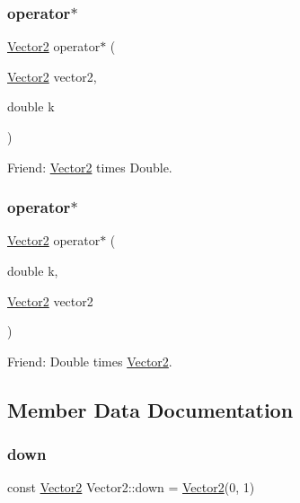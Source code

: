 \subsubsection{\texorpdfstring{operator$\ast$}{operator*}\hspace{0.1cm}{\footnotesize\ttfamily [1/2]}}
{\footnotesize\ttfamily \mbox{\hyperlink{struct_vector2}{Vector2}} operator$\ast$ (\begin{DoxyParamCaption}\item[{\mbox{\hyperlink{struct_vector2}{Vector2}}}]{vector2,  }\item[{double}]{k }\end{DoxyParamCaption})\hspace{0.3cm}{\ttfamily [friend]}}



Friend\+: \mbox{\hyperlink{struct_vector2}{Vector2}} times Double. 

\mbox{\label{struct_vector2_a6ac6360b23e2a1457b794f0aefc18f3a}} 
\subsubsection{\texorpdfstring{operator$\ast$}{operator*}\hspace{0.1cm}{\footnotesize\ttfamily [2/2]}}
{\footnotesize\ttfamily \mbox{\hyperlink{struct_vector2}{Vector2}} operator$\ast$ (\begin{DoxyParamCaption}\item[{double}]{k,  }\item[{\mbox{\hyperlink{struct_vector2}{Vector2}}}]{vector2 }\end{DoxyParamCaption})\hspace{0.3cm}{\ttfamily [friend]}}



Friend\+: Double times \mbox{\hyperlink{struct_vector2}{Vector2}}. 



\subsection{Member Data Documentation}
\mbox{\label{struct_vector2_a64cb9ddeb42abbcfa527c3e2660ffef9}} 
\subsubsection{\texorpdfstring{down}{down}}
{\footnotesize\ttfamily const \mbox{\hyperlink{struct_vector2}{Vector2}} Vector2\+::down = \mbox{\hyperlink{struct_vector2}{Vector2}}(0, 1)\hspace{0.3cm}{\ttfamily [static]}}

